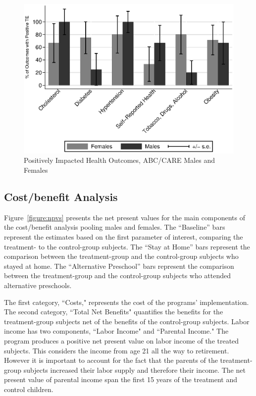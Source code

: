 \begin{figure}[H]
		\caption{Positively Impacted Health Outcomes, ABC/CARE Males and Females} \label{fig:ppositivecategory2}
		\includegraphics[width=.65\columnwidth]{output/itt_noctrl_cats2.eps}
\end{figure}

\subsection{Cost/benefit Analysis} \label{section:cbaresults}

Figure~\ref{figure:npvs} presents the net present values for the main components of the cost/benefit analysis pooling males and females. The ``Baseline'' bars represent the estimates based on the first parameter of interest, comparing the treatment- to the control-group subjects. The ``Stay at Home'' bars represent the comparison between the treatment-group and the control-group subjects who stayed at home. The ``Alternative Preschool'' bars represent the comparison between the treatment-group and the control-group subjects who attended alternative preschools.

The first category, ``Costs," represents the cost of the programs' implementation. The second category, ``Total Net Benefits" quantifies the benefits for the treatment-group subjects net of the benefits of the control-group subjects. Labor income has two components, ``Labor Income" and ``Parental Income." The program produces a positive net present value on labor income of the treated subjects. This considers the income from age 21 all the way to retirement. However it is important to account for the fact that the parents of the treatment-group subjects increased their labor supply and therefore their income. The net present value of parental income span the first 15 years of the treatment and control children.

